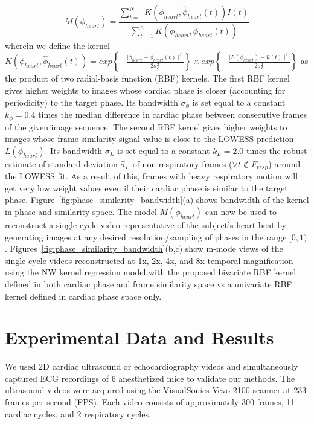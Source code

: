 \documentclass[journal]{IEEEtran}
\begin{document}
\begin{equation}
M(\phi_{heart}) = \frac{\sum_{t = 1}^{N} K \left( \phi_{heart}, \hat{\phi}_{heart}(t) \right) I(t)}{\sum_{t = 1}^{n} K \left( \phi_{heart}, \hat{\phi}_{heart}(t) \right)} 
\end{equation}
wherein we define the kernel $K\left( \phi_{heart}, \hat{\phi}_{heart}(t) \right) = exp\left \{ -\frac{ \mid \phi_{heart} - \hat{\phi}_{heart}(t) \mid^2}{2  \sigma^2_\phi} \right \} \times exp\left \{ -\frac{ \mid L(\phi_{heart}) - \hat{u}(t) \mid^2}{2  \sigma^2_{L}} \right \}$ as the product of two radial-basis function (RBF) kernels. The first RBF kernel gives higher weights to images whose cardiac phase is closer (accounting for periodicity) to the target phase. Its bandwidth $\sigma_\phi$ is set equal to a constant $k_\phi = 0.4$ times the median difference in cardiac phase between consecutive frames of the given image sequence. The second RBF kernel gives higher weights to images whose frame similarity signal value is close to the LOWESS prediction $L(\phi_{heart})$. Its bandwidth $\sigma_{L}$ is set equal to a constant $k_L = 2.0$ times the robust estimate of standard deviation $\hat{\sigma}_{L}$ of non-respiratory frames ($\forall t \notin F_{resp}$) around the LOWESS fit. As a result of this, frames with heavy respiratory motion will get very low weight values even if their cardiac phase is similar to the target phase. Figure~\ref{fig:phase_similarity_bandwidth}(a) shows bandwidth of the kernel in phase and similarity space. The model $M(\phi_{heart})$ can now be used to reconstruct a single-cycle video representative of the subject's heart-beat by generating images at any desired resolution/sampling of phases in the range $[0, 1)$.  Figures~\ref{fig:phase_similarity_bandwidth}(b,c) show m-mode views of the single-cycle videos reconstructed at 1x, 2x, 4x, and 8x temporal magnification using the NW kernel regression model with the proposed bivariate RBF kernel defined in both cardiac phase and frame similarity space vs a univariate RBF kernel defined in cardiac phase space only. 
%
\section{Experimental Data and Results}
\label{sec:results}
%
We used 2D cardiac ultrasound or echocardiography videos and simultaneously captured ECG recordings of 6 anesthetized mice to validate our methods. The ultrasound videos were acquired using the VisualSonics Vevo 2100 scanner at 233 frames per second (FPS). Each video consists of approximately 300 frames, 11 cardiac cycles, and 2 respiratory cycles.
\end{document}
